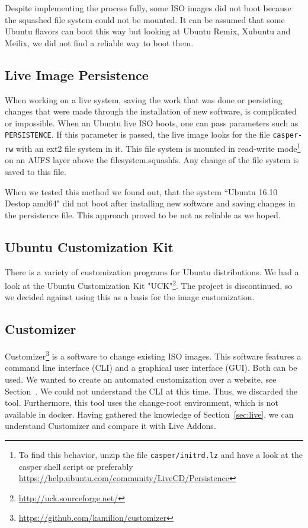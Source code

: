 \documentclass[english]{lni}
\begin{document}
Despite implementing the process fully, some ISO images did not boot because the 
squashed file system could not be mounted.
It can be assumed that some Ubuntu flavors can boot this way but looking at Ubuntu Remix, Xubuntu and Meilix, we did not find a reliable way to boot them.

\subsection{Live Image Persistence}
\label{sec:pers}

When working on a live system, saving the work that was done or persisting changes that were made through the installation of new software, is complicated or impossible.
When an Ubuntu live ISO boots, one can pass parameters such as \texttt{PERSISTENCE}.
If this parameter is passed, the live image looks for the file \texttt{casper-rw} with an ext2 file system in it.
This file system is mounted in read-write mode\footnote{To find this behavior, unzip the file \texttt{casper/initrd.lz} and have a look at the casper shell script or preferably \url{https://help.ubuntu.com/community/LiveCD/Persistence}} on an AUFS layer above the filesystem.squashfs.
Any change of the file system is saved to this file.

When we tested this method we found out, that the system ``Ubuntu 16.10 Destop amd64" did not boot after installing new software and saving changes in the persistence file.
This approach proved to be not as reliable as we hoped.

\subsection{Ubuntu Customization Kit}

There is a variety of customization programs for Ubuntu distributions.
We had a look at the Ubuntu Customization Kit "UCK"\footnote{\url{http://uck.sourceforge.net/}}.
The project is discontinued, so we decided against using this as a basis for the  image customization.


\subsection{Customizer}
\label{sec:customizer}

Customizer\footnote{\url{https://github.com/kamilion/customizer}} is a software to change existing ISO images.
This software features a command line interface (CLI) and a graphical user interface (GUI).
Both can be used.
We wanted to create an automated customization over a website, see Section~\cite{sec:custom}.
We could not understand the CLI at this time.
Thus, we discarded the tool.
Furthermore, this tool uses the change-root environment, which is not available in docker.
Having gathered the knowledge of Section~\ref{sec:live}, we can understand Customizer and compare it with Live Addons.
\end{document}
